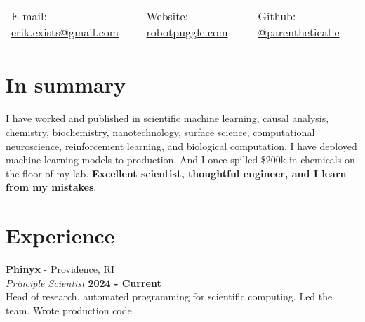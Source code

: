 \documentclass[margin,line]{res}
\begin{document}
\newcommand{\link}[1]{\texttt{#1}}
\providecommand{\tightlist}{%
    \setlength{\itemsep}{0pt}\setlength{\parskip}{0pt}}



\begin{resume}
\section{\sc }
\vspace{.05in}

\begin{tabular}{@{}p{2in}p{2in}p{2in}}
{E-mail:}  {\href{mailto:erik.exists@gmail.com}{erik.exists@gmail.com}} & {Website:} \href{http://robotpuggle.com}{robotpuggle.com} & {Github:} \href{https://github.com/parenthetical-e/}{@parenthetical-e} \\
\end{tabular}

\vspace{-.4cm}
\section{\sc In summary}
I have worked and published in scientific machine learning, causal analysis, chemistry,  biochemistry, nanotechnology, surface science, computational neuroscience, reinforcement learning, and biological computation. I have deployed machine learning models to production. And I once spilled \$200k in chemicals on the floor of my lab. \textbf{Excellent scientist, thoughtful engineer, and I learn from my mistakes}.



\vspace{-.35cm}
\section{\sc Experience}
{\bf Phinyx} - Providence, RI\\
{\em Principle Scientist} \hfill {\bf 2024 - Current}\\
Head of research, automated programming for scientific computing. Led the team. Wrote production code. 


\end{resume}
\end{document}

